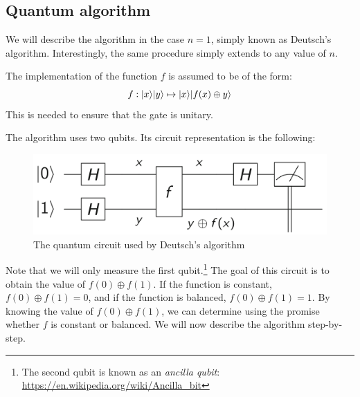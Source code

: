 \documentclass[12pt,a4paper]{article}
\theoremstyle{plain}
\theoremstyle{definition}
\DeclarePairedDelimiter\ket{\lvert}{\rangle}
\begin{document}
\subsection{Quantum algorithm}
We will describe the algorithm in the case $n=1$, simply known as Deutsch's algorithm. Interestingly, the same procedure simply extends to any value of $n$. 

The implementation of the function $f$ is assumed to be of the form:
\begin{equation*}
    f : \ket{x}\ket{y} \mapsto \ket{x}\ket{f(x)\oplus y}
\end{equation*}
This is needed to ensure that the gate is unitary.

The algorithm uses two qubits. Its circuit representation is the following:
\begin{figure}[!h]
    \centering
    \includegraphics*[scale=0.4]{deutsch-circuit.png}
    \caption{The quantum circuit used by Deutsch's algorithm}
\end{figure}

Note that we will only measure the first qubit.\footnote{The second qubit is known as an \emph{ancilla qubit}: \url{https://en.wikipedia.org/wiki/Ancilla_bit}} The goal of this circuit is to obtain the value of $f(0)\oplus f(1)$. If the function is constant, $f(0)\oplus f(1) = 0$, and if the function is balanced, $f(0)\oplus f(1) = 1$. By knowing the value of $f(0)\oplus f(1)$, we can determine using the promise whether $f$ is constant or balanced. We will now describe the algorithm step-by-step.
\end{document}
